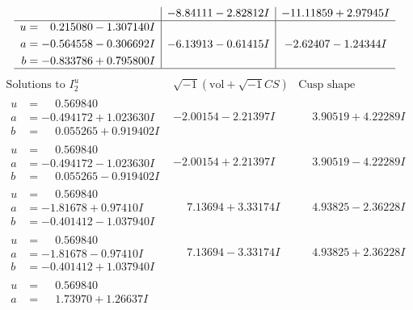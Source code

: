 \documentclass[1p]{elsarticle_modified}
\theoremstyle{definition}
\newcommand{\I}{\sqrt{-1}}
\begin{document}
$$\begin{array}{c|c|c}
 & -8.84111 - 2.82812 I & -11.11859 + 2.97945 I \\ \hline\begin{aligned}
u &= \phantom{-}0.215080 - 1.307140 I \\
a &= -0.564558 - 0.306692 I \\
b &= -0.833786 + 0.795800 I\end{aligned}
 & -6.13913 - 0.61415 I & -2.62407 - 1.24344 I\\
 \hline 
 \end{array}$$\newpage$$\begin{array}{c|c|c}  
\text{Solutions to }I^u_{2}& \I (\text{vol} + \sqrt{-1}CS) & \text{Cusp shape}\\
 \hline 
\begin{aligned}
u &= \phantom{-}0.569840\phantom{ +0.000000I} \\
a &= -0.494172 + 1.023630 I \\
b &= \phantom{-}0.055265 + 0.919402 I\end{aligned}
 & -2.00154 - 2.21397 I & \phantom{-}3.90519 + 4.22289 I \\ \hline\begin{aligned}
u &= \phantom{-}0.569840\phantom{ +0.000000I} \\
a &= -0.494172 - 1.023630 I \\
b &= \phantom{-}0.055265 - 0.919402 I\end{aligned}
 & -2.00154 + 2.21397 I & \phantom{-}3.90519 - 4.22289 I \\ \hline\begin{aligned}
u &= \phantom{-}0.569840\phantom{ +0.000000I} \\
a &= -1.81678 + 0.97410 I \\
b &= -0.401412 - 1.037940 I\end{aligned}
 & \phantom{-}7.13694 + 3.33174 I & \phantom{-}4.93825 - 2.36228 I \\ \hline\begin{aligned}
u &= \phantom{-}0.569840\phantom{ +0.000000I} \\
a &= -1.81678 - 0.97410 I \\
b &= -0.401412 + 1.037940 I\end{aligned}
 & \phantom{-}7.13694 - 3.33174 I & \phantom{-}4.93825 + 2.36228 I \\ \hline\begin{aligned}
u &= \phantom{-}0.569840\phantom{ +0.000000I} \\
a &= \phantom{-}1.73970 + 1.26637 I \\

\end{aligned}
\end{array}$$
\end{document}
